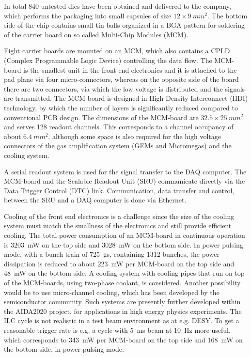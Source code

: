 In total 840 untested dies have been obtained and delivered to the company, which performs the packaging into small capsules of size $12\times\SI{9}{mm^2}$. The bottom side of the chip contains small tin balls organized in a BGA pattern for soldering of the carrier board on so called Multi-Chip Modules (MCM).

Eight carrier boards are mounted on an MCM, which also contains a CPLD (Complex Programmable Logic Device) controlling the data flow. The MCM-board is the smallest unit in the front end electronics and it is attached to the pad plane via four micro-connectors, whereas on the opposite side of the board there are two connectors, via which the low voltage is distributed and the signals are transmitted. The MCM-board is designed in High Density Interconnect (HDI) technology, by which the number of layers is significantly reduced compared to conventional PCB design. The dimensions of the MCM-board are $32.5 \times \SI{25}{mm^2}$ and serves 128 readout channels. This corresponds to a channel occupancy of about $\SI{6.4}{mm^{2}}$, although some space is also required for the high voltage connectors of the gas amplification system (GEMs and Micromegas) and the cooling system.

A serial readout system is used for the signal transfer to the DAQ computer. The MCM-board and the Scalable Readout Unit (SRU) communicate directly via the Data Trigger Control (DTC) link. Communication, data transfer and control, between the SRU and a DAQ computer is done via Ethernet.

Cooling of the front end electronics is a challenge since the size of the cooling system must match the smallness of the electronics and still provide efficient cooling. The total power consumption of an MCM-board in continuous operation
is \SI{3203}{mW} on the top side and \SI{3028}{mW} on the bottom side. In power pulsing mode, with a bunch train of \SI{725}{\micro s}, containing 1312 bunches, the power dissipation is reduced to about \SI{223}{mW} per MCM-board on the top side and \SI{48}{mW} on the bottom side. A cooling system with cooling pipes that run on top of the MCM-boards, using two-phase  coolant, is considered. Another possibility would be to use micro-channel cooling, which has been developed by the semiconductor community. Such systems are presently further developed within the AIDA2020 project, for applications in high energy physics experiments. The ILC cycle is not realistic in a test beam environment as at e.g. DESY. To get a reasonable trigger rate is e.g. a cycle with \SI{5}{ms} beam at \SI{10}{Hz} more useful, which corresponds to \SI{343}{mW} per MCM-board on the top side and \SI{168}{mW} on the bottom side, in power pulsing mode.

